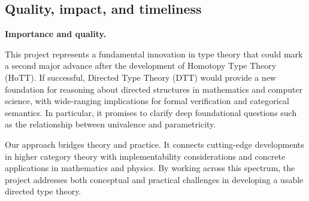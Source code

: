 \documentclass[a4paper,11pt]{article}
\renewcommand{\paragraph}[1]{\textbf{#1.}}
\begin{document}




\subsection{Quality, impact, and timeliness}

\paragraph{Importance and quality}

This project represents a fundamental innovation in type theory that
could mark a second major advance after the development of Homotopy
Type Theory (HoTT). If successful, Directed Type Theory (DTT) would
provide a new foundation for reasoning about directed structures in
mathematics and computer science, with wide-ranging implications for
formal verification and categorical semantics. In particular, it
promises to clarify deep foundational questions such as the
relationship between univalence and parametricity.

Our approach bridges theory and practice. It connects cutting-edge
developments in higher category theory with implementability
considerations and concrete applications in mathematics and
physics. By working across this spectrum, the project addresses both
conceptual and practical challenges in developing a usable directed
type theory.
\end{document}
